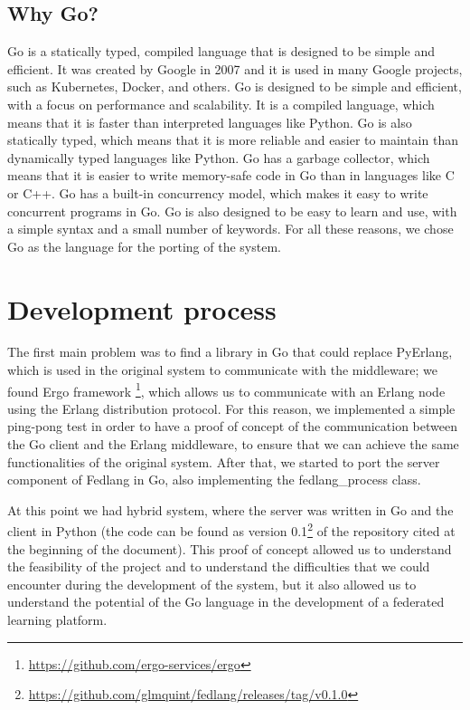 \subsection{Why Go?}
Go is a statically typed, compiled language that is designed to be simple and efficient. It was created by Google in 2007 and it is used in many Google projects, such as Kubernetes, Docker, and others. Go is designed to be simple and efficient, with a focus on performance and scalability. It is a compiled language, which means that it is faster than interpreted languages like Python. Go is also statically typed, which means that it is more reliable and easier to maintain than dynamically typed languages like Python. Go has a garbage collector, which means that it is easier to write memory-safe code in Go than in languages like C or C++. Go has a built-in concurrency model, which makes it easy to write concurrent programs in Go. Go is also designed to be easy to learn and use, with a simple syntax and a small number of keywords. For all these reasons, we chose Go as the language for the porting of the system.

\section{Development process}
The first main problem was to find a library in Go that could replace PyErlang, which is used in the original system to communicate with the middleware; we found Ergo framework \footnote{\url{https://github.com/ergo-services/ergo}}, which allows us to communicate with an Erlang node using the Erlang distribution protocol.
For this reason, we implemented a simple ping-pong test in order to have a proof of concept of the communication between the Go client and the Erlang middleware, to ensure that we can achieve the same functionalities of the original system. After that, we started to port the server component of Fedlang in Go, also implementing the fedlang\_process class. 

At this point we had hybrid system, where the server was written in Go and the client in Python (the code can be found as version 0.1\footnote{\url{https://github.com/glmquint/fedlang/releases/tag/v0.1.0}} of the repository cited at the beginning of the document). This proof of concept allowed us to understand the feasibility of the project and to understand the difficulties that we could encounter during the development of the system, but it also allowed us to understand the potential of the Go language in the development of a federated learning platform.

